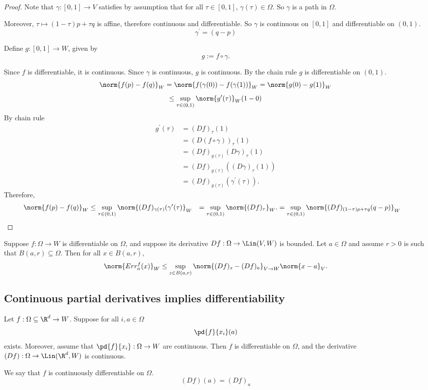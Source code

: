 \begin{proof}
    Note that $\gamma:[0,1] \to V$ satisfies by assumption that for all $\tau \in [0,1]$, $\gamma(\tau) \in \Omega$.
    So $\gamma$ is a path in $\Omega$.

    Moreover, $\tau \mapsto (1-\tau)p + \tau q$ is affine, therefore continuous and differentiable.
    So $\gamma$ is continuous on $[0,1]$ and differentiable on $(0,1)$.
    $$\gamma^\prime = (q-p)$$

    Define $g: [0,1] \to W$, given by
    $$g:= f \circ \gamma.$$

    Since $f$ is differentiable, it is continuous. Since $\gamma$ is continuous, $g$ is continuous.
    By the chain rule $g$ is differentiable on $(0,1)$.
    $$\norm{f(p) - f(q)}_W = \norm{f(\gamma(0)) - f(\gamma(1))}_W = \norm{g(0)-g(1)}_W$$
    $$\le \sup_{\tau \in (0,1)} \norm{g^\prime(\tau)}_W(1-0)$$
    By chain rule
    \begin{align*}
        g^\prime(\tau) &= (Df)_\tau(1)\\
                       &= (D(f \circ \gamma))_\tau(1)\\
                       &= (Df)_{g(\tau)}(D\gamma)_\tau(1)\\
                       &= (Df)_{g(\tau)}((D\gamma)_\tau(1))\\
                       &= (Df)_{g(\tau)}(\gamma^\prime(\tau)).
    \end{align*}
    Therefore,
    \begin{align*}
        \norm{f(p)-f(q)}_W &\le \sup_{\tau \in (0,1)}\norm{(Df)_{\gamma(\tau)}(\gamma^\prime(\tau)}_W
                           &= \sup_{\tau \in (0,1)}\norm{(Df)_\tau}_W.
                           &= \sup_{\tau \in (0,1)}\norm{(Df)_{(1-\tau)p+\tau q}(q-p)}_W 
    \end{align*}

\end{proof}

\begin{lemma}
    Suppose $f: \Omega \to W$ is differentiable on $\Omega$, and suppose its
    derivative $Df: \Omega \to \Lin(V,W)$ is bounded. Let $a \in \Omega$ and
    assume $r > 0$ is such that $B(a,r) \subseteq \Omega$. Then for all
    $x \in B(a,r)$,
    $$\norm{Err_a^f(x)}_W \le \sup_{z \in B(a,r)} \norm{(Df)_z - (Df)_a}_{V \to W}\norm{x-a}_V.$$
\end{lemma}

\subsection{Continuous partial derivatives implies differentiability}
\begin{theorem}
    Let $f:\Omega\subseteq\R^d \to W$. Suppose for all $i, a \in \Omega$
    $$\pd{f}{x_i}(a)$$
    exists. Moreover, assume that $\pd{f}{x_i}: \Omega \to W$ are continuous. Then $f$ is differentiable on $\Omega$,
    and the derivative $(Df): \Omega \to \Lin(\R^d, W)$ is continuous.

    We say that $f$ is continuously differentiable on $\Omega$.
    $$(Df)(a) = (Df)_a$$
\end{theorem}

